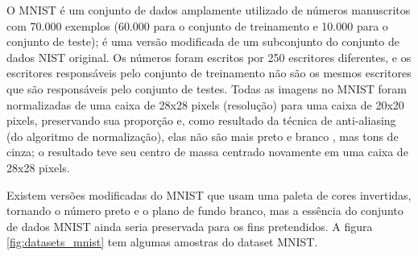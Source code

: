 O MNIST é um conjunto de dados amplamente utilizado de números manuscritos com 70.000 exemplos (60.000 para o conjunto de treinamento e 10.000 para o conjunto de teste); é uma versão modificada de um subconjunto do conjunto de dados NIST original. Os números foram escritos por 250 escritores diferentes, e os escritores responsáveis pelo conjunto de treinamento não são os mesmos escritores que são responsáveis pelo conjunto de testes. Todas as imagens no MNIST foram normalizadas de uma caixa de 28x28 pixels (resolução) para uma caixa de 20x20 pixels, preservando sua proporção e, como resultado da técnica de anti-aliasing (do algoritmo de normalização), elas não são mais preto e branco , mas tons de cinza; o resultado teve seu centro de massa centrado novamente em uma caixa de 28x28 pixels.

Existem versões modificadas do MNIST que usam uma paleta de cores invertidas, tornando o número preto e o plano de fundo branco, mas a essência do conjunto de dados MNIST ainda seria preservada para os fins pretendidos. A figura \ref{fig:datasets_mnist} tem algumas amostras do dataset MNIST.

